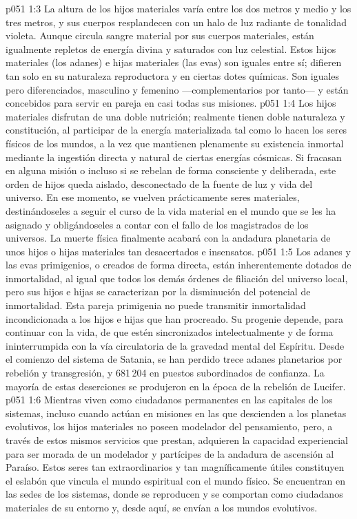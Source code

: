 \vs p051 1:3 \pc La altura de los hijos materiales varía entre los dos metros y medio y los tres metros, y sus cuerpos resplandecen con un halo de luz radiante de tonalidad violeta. Aunque circula sangre material por sus cuerpos materiales, están igualmente repletos de energía divina y saturados con luz celestial. Estos hijos materiales (los adanes) e hijas materiales (las evas) son iguales entre sí; difieren tan solo en su naturaleza reproductora y en ciertas dotes químicas. Son iguales pero diferenciados, masculino y femenino ---complementarios por tanto--- y están concebidos para servir en pareja en casi todas sus misiones.
\vs p051 1:4 Los hijos materiales disfrutan de una doble nutrición; realmente tienen doble naturaleza y constitución, al participar de la energía materializada tal como lo hacen los seres físicos de los mundos, a la vez que mantienen plenamente su existencia inmortal mediante la ingestión directa y natural de ciertas energías cósmicas. Si fracasan en alguna misión o incluso si se rebelan de forma consciente y deliberada, este orden de hijos queda aislado, desconectado de la fuente de luz y vida del universo. En ese momento, se vuelven prácticamente seres materiales, destinándoseles a seguir el curso de la vida material en el mundo que se les ha asignado y obligándoseles a contar con el fallo de los magistrados de los universos. La muerte física finalmente acabará con la andadura planetaria de unos hijos o hijas materiales tan desacertados e insensatos.
\vs p051 1:5 Los adanes y las evas primigenios, o creados de forma directa, están inherentemente dotados de inmortalidad, al igual que todos los demás órdenes de filiación del universo local, pero sus hijos e hijas se caracterizan por la disminución del potencial de inmortalidad. Esta pareja primigenia no puede transmitir inmortalidad incondicionada a los hijos e hijas que han procreado. Su progenie depende, para continuar con la vida, de que estén sincronizados intelectualmente y de forma ininterrumpida con la vía circulatoria de la gravedad mental del Espíritu. Desde el comienzo del sistema de Satania, se han perdido trece adanes planetarios por rebelión y transgresión, y 681\,204 en puestos subordinados de confianza. La mayoría de estas deserciones se produjeron en la época de la rebelión de Lucifer.
\vs p051 1:6 \pc Mientras viven como ciudadanos permanentes en las capitales de los sistemas, incluso cuando actúan en misiones en las que descienden a los planetas evolutivos, los hijos materiales no poseen modelador del pensamiento, pero, a través de estos mismos servicios que prestan, adquieren la capacidad experiencial para ser morada de un modelador y partícipes de la andadura de ascensión al Paraíso. Estos seres tan extraordinarios y tan magníficamente útiles constituyen el eslabón que vincula el mundo espiritual con el mundo físico. Se encuentran en las sedes de los sistemas, donde se reproducen y se comportan como ciudadanos materiales de su entorno y, desde aquí, se envían a los mundos evolutivos.

